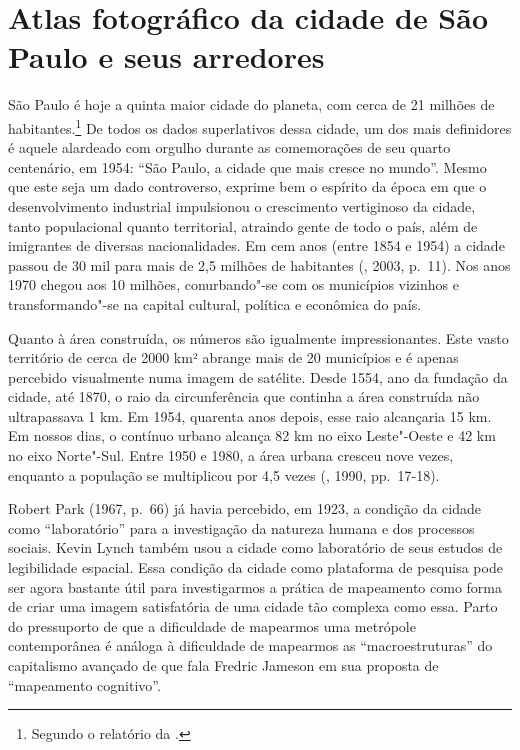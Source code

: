 \chapter*{Atlas fotográfico da cidade de São Paulo e seus arredores}

São Paulo é hoje a quinta maior cidade do planeta, com cerca de 21
milhões de habitantes.\footnote{Segundo o relatório da  {}.} De todos os dados superlativos dessa cidade,
um dos mais definidores é aquele alardeado com orgulho durante as
comemorações de seu quarto centenário, em 1954: ``São Paulo, a cidade
que mais cresce no mundo''. Mesmo que este seja um dado controverso,
exprime bem o espírito da época em que o desenvolvimento industrial
impulsionou o crescimento vertiginoso da cidade, tanto populacional
quanto territorial, atraindo gente de todo o país, além de imigrantes de
diversas nacionalidades. Em cem anos (entre 1854 e 1954) a cidade passou
de 30 mil para mais de 2,5 milhões de habitantes (, 2003, p.~11).
Nos anos 1970 chegou aos 10 milhões, conurbando"-se com os municípios
vizinhos e transformando"-se na capital cultural, política e econômica do
país.

Quanto à área construída, os números são igualmente impressionantes.
Este vasto território de cerca de 2000 km² abrange mais de 20 municípios
e é apenas percebido visualmente numa imagem de satélite. Desde 1554,
ano da fundação da cidade, até 1870, o raio da circunferência que
continha a área construída não ultrapassava 1 km. Em 1954, quarenta anos
depois, esse raio alcançaria 15 km. Em nossos dias, o contínuo urbano
alcança 82 km no eixo Leste"-Oeste e 42 km no eixo Norte"-Sul. Entre 1950
e 1980, a área urbana cresceu nove vezes, enquanto a população se
multiplicou por 4,5 vezes (, 1990, pp.~17-18).

Robert Park (1967, p.~66) já havia percebido, em 1923, a condição da
cidade como ``laboratório'' para a investigação da natureza humana e dos
processos sociais. Kevin Lynch também usou a cidade como laboratório de
seus estudos de legibilidade espacial. Essa condição da cidade como
plataforma de pesquisa pode ser agora bastante útil para investigarmos a
prática de mapeamento como forma de criar uma imagem satisfatória de uma
cidade tão complexa como essa. Parto do pressuporto de que a dificuldade
de mapearmos uma metrópole contemporânea é análoga à dificuldade de
mapearmos as ``macroestruturas'' do capitalismo avançado de que fala
Fredric Jameson em sua proposta de ``mapeamento cognitivo''.

